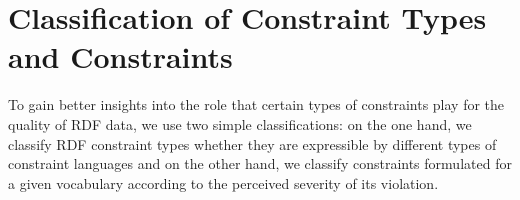 \documentclass[conference]{IEEEtran}
\begin{document}
%






\section{Classification of Constraint Types and Constraints}
\label{classification}

To gain better insights into the role that certain types of constraints play for the quality of RDF data, we use two simple classifications: on the one hand, we classify RDF constraint types whether they are expressible by different types of constraint languages and on the other hand, we classify constraints formulated for a given vocabulary according to the perceived severity of its violation. 
\end{document}
